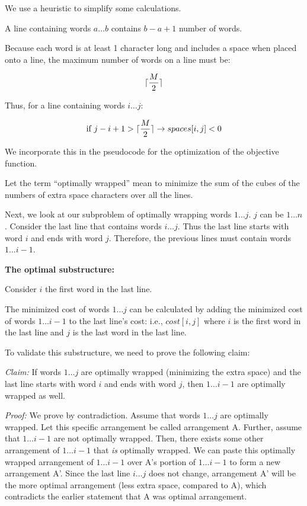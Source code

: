 \documentclass[a4paper]{report}
\DeclarePairedDelimiter{\ceil}{\lceil}{\rceil}
\begin{document}
\begin{enumerate}
      We use a heuristic to simplify some calculations. 

      A line containing words $a\dots b$ contains $b - a + 1$ number of words.
      
      Because each word is at least 1 character long and includes a space
      when placed onto a line, the maximum number of words on a line must be: 
      
      $$\ceil{\frac{M}{2}}$$ 

      Thus, for a line containing words $i \dots j$:

      \begin{align}
        \text{if } j - i + 1 > \ceil{\frac{M}{2}} \rightarrow spaces[i,j] < 0
      \end{align}

      We incorporate this in the pseudocode for the optimization of the objective function.

      Let the term ``optimally wrapped'' mean to minimize the sum of the cubes of the numbers of extra space characters
      over all the lines. 

      Next, we look at our subproblem of optimally wrapping words $1 \dots j$. 
      $j$ can be $1 \dots n$. Consider the last line that contains words
      $i \dots j$. Thus the last line starts with word $i$ and ends with word $j$. Therefore, the previous lines must contain
      words $1 \dots i-1$.

      {\bf The optimal substructure:}
      
      Consider $i$ the first word in the last line.

      The minimized cost of words $1\dots j$ can be calculated by adding the minimized cost of words $1\dots i-1$ 
      to the last line's
      cost: i.e., $cost[i,j]$ where $i$ is the first word in the last line and $j$ is the last word in the last line. 

      To validate this substructure, we need to prove the following claim:

      {\it Claim: }  If words $1 \dots j$ are optimally wrapped (minimizing the extra space) and the last line
      starts with word $i$ and ends with word $j$, then $1 \dots i-1$ are optimally wrapped as well. 

      {\it Proof: } We prove by contradiction. Assume that words $1 \dots j$ are optimally wrapped. Let this specific arrangement be
      called arrangement A. Further,
      assume that $1 \dots i-1$ are not optimally wrapped. Then, there exists some other arrangement of $1 \dots i-1$ that
      {\it is} optimally wrapped. We can paste this optimally wrapped arrangement of $1 \dots i-1$ over A's portion of
      $1 \dots i-1$ to form a new arrangement A'. Since
      the last line $i \dots j$ does not change, arrangement A' will be the more optimal arrangement (less extra space, compared
      to A), which contradicts the earlier statement that A was optimal arrangement. 


\end{enumerate}
\end{document}
